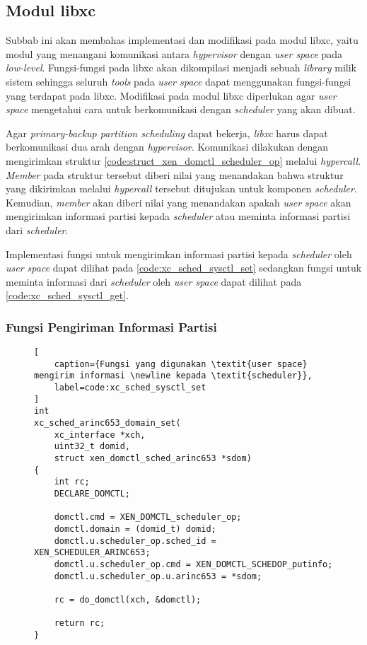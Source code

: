 \subsection{Modul libxc}
\label{section:modul_libxc}

Subbab ini akan membahas implementasi dan modifikasi pada modul libxc, yaitu modul yang
menangani komunikasi antara \textit{hypervisor} dengan \textit{user space} pada
\textit{low-level}. Fungsi-fungsi pada libxc akan dikompilasi menjadi sebuah \textit{library}
milik sistem sehingga seluruh \textit{tools} pada \textit{user space} dapat menggunakan
fungsi-fungsi yang terdapat pada libxc. Modifikasi pada modul libxc diperlukan agar \textit{user
space} mengetahui cara untuk berkomunikasi dengan \textit{scheduler} yang akan dibuat.

Agar \textit{primary-backup partition scheduling} dapat bekerja, \textit{libxc} harus dapat
berkomunikasi dua arah dengan \textit{hypervisor}. Komunikasi dilakukan dengan mengirimkan
struktur \autoref{code:struct_xen_domctl_scheduler_op} melalui \textit{hypercall}.
\textit{Member}  pada struktur tersebut diberi nilai yang menandakan bahwa
struktur yang dikirimkan melalui \textit{hypercall} tersebut ditujukan untuk komponen
\textit{scheduler}. Kemudian, \textit{member}  akan diberi nilai yang menandakan
apakah \textit{user space} akan mengirimkan informasi partisi kepada \textit{scheduler} atau
meminta informasi partisi dari \textit{scheduler}.

Implementasi fungsi untuk mengirimkan informasi partisi kepada \textit{scheduler} oleh \textit{user
space} dapat dilihat pada \autoref{code:xc_sched_sysctl_set} sedangkan fungsi untuk meminta
informasi dari \textit{scheduler} oleh \textit{user space} dapat dilihat pada
\autoref{code:xc_sched_sysctl_get}.

\subsubsection{Fungsi Pengiriman Informasi Partisi}

\begin{figure}[!h]
\begin{lstlisting}[
	caption={Fungsi yang digunakan \textit{user space} mengirim informasi \newline kepada \textit{scheduler}},
	label=code:xc_sched_sysctl_set
]
int
xc_sched_arinc653_domain_set(
    xc_interface *xch,
    uint32_t domid,
    struct xen_domctl_sched_arinc653 *sdom)
{
    int rc;
    DECLARE_DOMCTL;

    domctl.cmd = XEN_DOMCTL_scheduler_op;
    domctl.domain = (domid_t) domid;
    domctl.u.scheduler_op.sched_id = XEN_SCHEDULER_ARINC653;
    domctl.u.scheduler_op.cmd = XEN_DOMCTL_SCHEDOP_putinfo;
    domctl.u.scheduler_op.u.arinc653 = *sdom;

    rc = do_domctl(xch, &domctl);

    return rc;
}
\end{lstlisting}
\end{figure}

